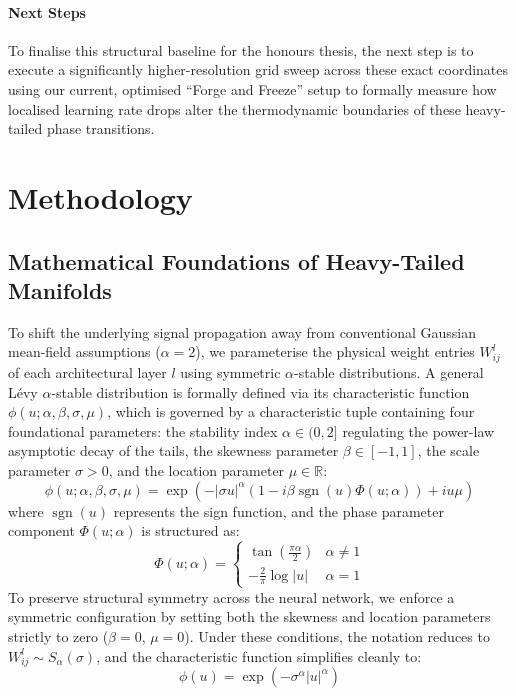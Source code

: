 \documentclass[10pt,a4paper]{article}
\begin{document}
	\paragraph{Next Steps}
	To finalise this structural baseline for the honours thesis, the next step is to execute a significantly higher-resolution grid sweep across these exact coordinates using our current, optimised ``Forge and Freeze'' setup to formally measure how localised learning rate drops alter the thermodynamic boundaries of these heavy-tailed phase transitions.
	\section{Methodology}
	\subsection{Mathematical Foundations of Heavy-Tailed Manifolds}
	
	To shift the underlying signal propagation away from conventional Gaussian mean-field assumptions ($\alpha=2$), we parameterise the physical weight entries $W_{ij}^{l}$ of each architectural layer $l$ using symmetric $\alpha$-stable distributions. A general L\'evy $\alpha$-stable distribution is formally defined via its characteristic function $\phi(u; \alpha, \beta, \sigma, \mu)$, which is governed by a characteristic tuple containing four foundational parameters: the stability index $\alpha \in (0, 2]$ regulating the power-law asymptotic decay of the tails, the skewness parameter $\beta \in [-1, 1]$, the scale parameter $\sigma > 0$, and the location parameter $\mu \in \mathbb{R}$:
	\begin{equation}
		\phi(u; \alpha, \beta, \sigma, \mu) = \exp \left( -|\sigma u|^\alpha \left( 1 - i\beta \operatorname{sgn}(u)\Phi(u; \alpha) \right) + iu\mu \right)
	\end{equation}
	where $\operatorname{sgn}(u)$ represents the sign function, and the phase parameter component $\Phi(u; \alpha)$ is structured as:
	\begin{equation}
		\Phi(u; \alpha) = \begin{cases} \tan\left(\frac{\pi\alpha}{2}\right) & \alpha \neq 1 \\ -\frac{2}{\pi} \log|u| & \alpha = 1 \end{cases}
	\end{equation}
	To preserve structural symmetry across the neural network, we enforce a symmetric configuration by setting both the skewness and location parameters strictly to zero ($\beta = 0$, $\mu = 0$). Under these conditions, the notation reduces to $W_{ij}^{l} \sim S_{\alpha}(\sigma)$, and the characteristic function simplifies cleanly to:
	\begin{equation}
		\phi(u) = \exp\left(-\sigma^\alpha |u|^\alpha\right)
	\end{equation}
	
\end{document}
